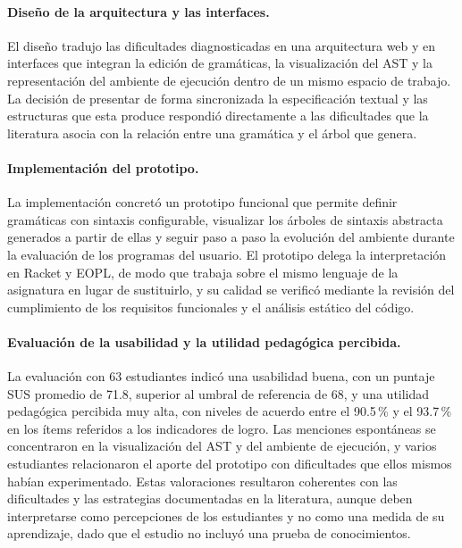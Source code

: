 \paragraph{Diseño de la arquitectura y las interfaces.} El diseño tradujo las dificultades diagnosticadas en una arquitectura web y en interfaces que integran la edición de gramáticas, la visualización del AST y la representación del ambiente de ejecución dentro de un mismo espacio de trabajo. La decisión de presentar de forma sincronizada la especificación textual y las estructuras que esta produce respondió directamente a las dificultades que la literatura asocia con la relación entre una gramática y el árbol que genera.

\paragraph{Implementación del prototipo.} La implementación concretó un prototipo funcional que permite definir gramáticas con sintaxis configurable, visualizar los árboles de sintaxis abstracta generados a partir de ellas y seguir paso a paso la evolución del ambiente durante la evaluación de los programas del usuario. El prototipo delega la interpretación en Racket y EOPL, de modo que trabaja sobre el mismo lenguaje de la asignatura en lugar de sustituirlo, y su calidad se verificó mediante la revisión del cumplimiento de los requisitos funcionales y el análisis estático del código.

\paragraph{Evaluación de la usabilidad y la utilidad pedagógica percibida.} La evaluación con 63 estudiantes indicó una usabilidad buena, con un puntaje SUS promedio de 71.8, superior al umbral de referencia de 68, y una utilidad pedagógica percibida muy alta, con niveles de acuerdo entre el 90.5\,\% y el 93.7\,\% en los ítems referidos a los indicadores de logro. Las menciones espontáneas se concentraron en la visualización del AST y del ambiente de ejecución, y varios estudiantes relacionaron el aporte del prototipo con dificultades que ellos mismos habían experimentado. Estas valoraciones resultaron coherentes con las dificultades y las estrategias documentadas en la literatura, aunque deben interpretarse como percepciones de los estudiantes y no como una medida de su aprendizaje, dado que el estudio no incluyó una prueba de conocimientos.

